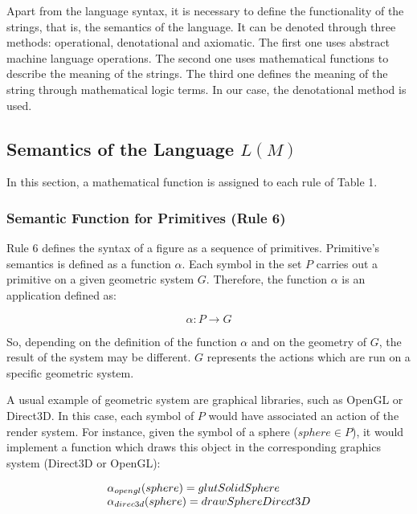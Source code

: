 \documentclass[10pt,journal,letterpaper,compsoc]{IEEEtran}
\begin{document}
Apart from the language syntax, it is necessary to define the functionality of the strings, that is,
the semantics of the language. It can be denoted through three methods:
operational, denotational and axiomatic. The first one uses abstract machine language
operations. The second one uses mathematical functions to describe the meaning of the strings. The
third one defines the meaning of the string through mathematical logic terms. In our case, the
denotational method is used.



\subsection{Semantics of the Language $L(M)$
\label{sec:semantic}}

In this section, a mathematical function is assigned to each rule of Table 1.


\subsubsection{Semantic Function for Primitives (Rule 6)
\label{sec:rule6}}

Rule 6 defines the syntax of a figure as a sequence of primitives. Primitive's semantics is defined
as a function $\alpha$. Each symbol in the set $P$ carries out a primitive on a given geometric
system $G$. Therefore, the function $\alpha$ is an application defined as:

\begin{equation}
    \alpha: P \rightarrow G
\end{equation}


So, depending on the definition of the function $\alpha$ and on the geometry of $G$, the result of the
system may be different. $G$ represents the actions which are run on a specific geometric system.

A usual example of geometric system are graphical libraries, such as OpenGL or Direct3D. In this
case, each symbol of $P$ would have associated an action of the render system. For instance, given
the symbol of a sphere ($sphere \in P$), it would implement a function which draws this object in
the corresponding graphics system (Direct3D or OpenGL):

\[ \begin{tabular}{l}
$\alpha_{opengl}(sphere) = glutSolidSphere$ \\
$\alpha_{direc3d}(sphere) = drawSphereDirect3D$
\end{tabular} \]
\end{document}
